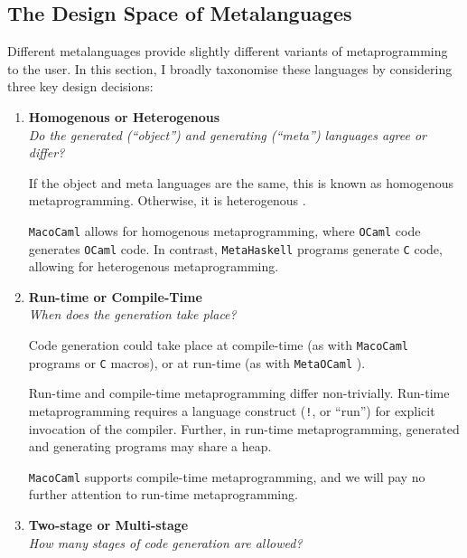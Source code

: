 \subsection{The Design Space of Metalanguages}\label{subsection:metaprogramming-design}
Different metalanguages provide slightly different variants of metaprogramming to the user. In this section, I broadly taxonomise these languages by considering three key design decisions:
\begin{enumerate}
  \item \textbf{\textsf{Homogenous or Heterogenous}}\\
         \textit{Do the generated (``object'') and generating (``meta'') languages agree or differ?}
  
        If the object and meta languages are the same, this is known as {homogenous} metaprogramming. Otherwise, it is {heterogenous} \citep{kiselyov-2024}.

        \texttt{MacoCaml} allows for homogenous metaprogramming, where \texttt{OCaml} code generates \texttt{OCaml} code. In contrast, \texttt{MetaHaskell} \citep{mainland-2012} programs generate \texttt{C} code, allowing for heterogenous metaprogramming. 

  \item \textbf{\textsf{Run-time or Compile-Time}} \\
        \textit{When does the generation take place?}

        Code generation could take place at compile-time (as with \texttt{MacoCaml} programs or \texttt{C} macros), or at run-time (as with \texttt{MetaOCaml} \citep{kiselyov-14}). 

        
        Run-time and compile-time metaprogramming differ non-trivially. Run-time metaprogramming requires a language construct (\texttt{!}, or ``run'') for explicit invocation of the compiler. Further, in run-time metaprogramming, generated and generating programs may share a heap. 

        \texttt{MacoCaml} supports compile-time metaprogramming, and we will pay no further attention to run-time metaprogramming.
        
  \item \textbf{\textsf{Two-stage or Multi-stage}} \\
  \textit{How many stages of code generation are allowed?}


\end{enumerate}
